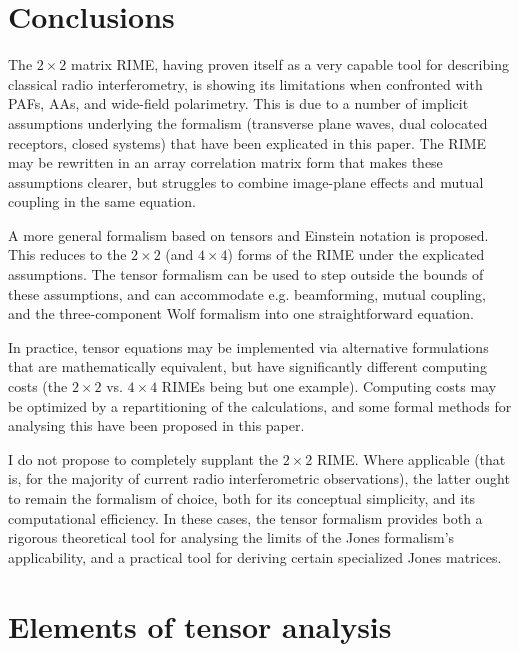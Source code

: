 \documentclass{aa}
\begin{document}
\section{Conclusions}

The $2\times2$ matrix RIME, having proven itself as a very capable tool for describing classical radio interferometry, is showing its limitations when confronted with PAFs, AAs, and wide-field polarimetry. This is due to a number of implicit assumptions underlying the formalism (transverse plane waves, dual colocated receptors, closed systems) that have been explicated in this paper. The RIME may be rewritten in an array correlation matrix form that makes these assumptions clearer, but struggles to combine image-plane effects and mutual coupling in the same equation.

A more general formalism based on tensors and Einstein notation is proposed. This reduces to the $2\times2$ (and $4\times4$) forms of the RIME under the explicated assumptions. The tensor formalism can be used to step outside the bounds of these assumptions, and can accommodate e.g.
beamforming, mutual coupling, and the three-component Wolf formalism into one straightforward equation. 

In practice, tensor equations may be implemented via alternative formulations that are mathematically equivalent, but have significantly different 
computing costs (the $2\times2$ vs. $4\times4$ RIMEs being but one example). Computing costs may be optimized by a repartitioning of the calculations, and some formal methods for analysing this have been proposed in this paper.

I do not propose to completely supplant the $2\times2$ RIME. Where applicable (that is, for the majority of current radio interferometric observations), the latter ought to remain the formalism of choice, both for its conceptual simplicity, and its computational efficiency. In these cases, the tensor formalism provides both a rigorous theoretical tool for analysing the limits of the Jones formalism's applicability, and a practical tool for deriving certain specialized Jones matrices.

\appendix

\section{Elements of tensor analysis}
\label{sec:tensor-theory}
\end{document}

